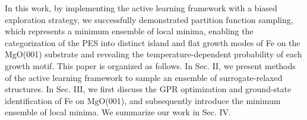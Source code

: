 In this work, by implementing the active learning framework with a biased exploration strategy, we successfully demonstrated partition function sampling, which represents a minimum ensemble of local minima, enabling the categorization of the PES into distinct island and flat growth modes of Fe on the MgO(001) substrate and revealing the temperature-dependent probability of each growth motif. This paper is organized as follows. In Sec. II, we present methods of the active learning framework to sample an ensemble of surrogate-relaxed structures. In Sec. III, we first discuss the GPR optimization and ground-state identification of Fe on MgO(001), and subsequently introduce the minimum ensemble of local minima. We summarize our work in Sec. IV.